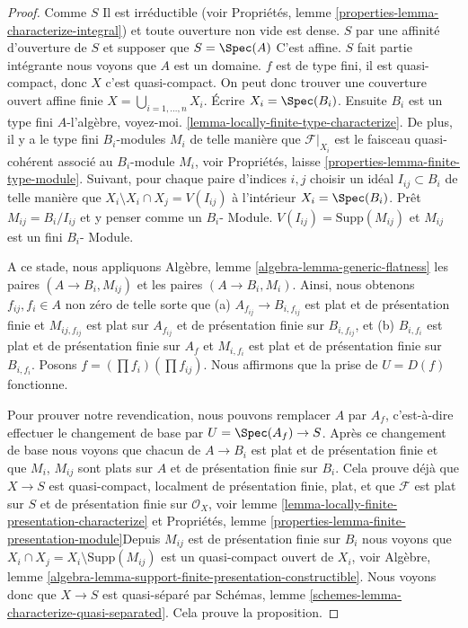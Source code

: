 \begin{proof}

Comme $S$ Il est irréductible (voir Propriétés, lemme \ref{properties-lemma-characterize-integral}) et toute ouverture non vide est dense.
$S$ par une affinité d'ouverture de $S$ et supposer que $S = \Spec(A)$ C'est affine. $S$ fait partie intégrante nous voyons que $A$ est un domaine. $f$ est de type fini, il est quasi-compact, donc $X$ c'est quasi-compact. On peut donc trouver une couverture ouvert affine finie
$X = \bigcup_{i = 1, \ldots, n} X_i$. Écrire $X_i = \Spec(B_i)$. Ensuite $B_i$ est un type fini $A$-l'algèbre, voyez-moi. \ref{lemma-locally-finite-type-characterize}. De plus, il y a le type fini
$B_i$-modules $M_i$ de telle manière que $\mathcal{F}|_{X_i}$ est le faisceau quasi-cohérent associé au $B_i$-module $M_i$, voir Propriétés, laisse \ref{properties-lemma-finite-type-module}. Suivant, pour chaque paire d'indices $i, j$ choisir un idéal $I_{ij} \subset B_i$
de telle manière que $X_i \setminus X_i \cap X_j = V(I_{ij})$ à l'intérieur
$X_i = \Spec(B_i)$. Prêt $M_{ij} = B_i/I_{ij}$ et y penser comme un $B_i$- Module. $V(I_{ij}) = \text{Supp}(M_{ij})$
et $M_{ij}$ est un fini $B_i$- Module.

\medskip\noindent
A ce stade, nous appliquons Algèbre, lemme \ref{algebra-lemma-generic-flatness} les paires $(A \to B_i, M_{ij})$ et les paires $(A \to B_i, M_i)$. Ainsi, nous obtenons $f_{ij}, f_i \in A$ non zéro de telle sorte que (a) $A_{f_{ij}} \to B_{i, f_{ij}}$ est plat et de présentation finie et $M_{ij, f_{ij}}$ est plat sur $A_{f_{ij}}$ et de présentation finie sur $B_{i, f_{ij}}$, et (b) $B_{i, f_i}$ est plat et de présentation finie sur $A_f$ et $M_{i, f_i}$ est plat et de présentation finie sur $B_{i, f_i}$. Posons $f = (\prod f_i) (\prod f_{ij})$. Nous affirmons que la prise de $U = D(f)$ fonctionne.

\medskip\noindent

Pour prouver notre revendication, nous pouvons remplacer $A$ par $A_f$, c'est-à-dire effectuer le changement de base par $U = \Spec(A_f) \to S$. Après ce changement de base nous voyons que chacun de $A \to B_i$ est plat et de présentation finie et que $M_i$, $M_{ij}$ sont plats sur $A$
et de présentation finie sur $B_i$. Cela prouve déjà que $X \to S$ est quasi-compact, localment de présentation finie, plat, et que $\mathcal{F}$
est plat sur $S$ et de présentation finie sur $\mathcal{O}_X$, voir lemme \ref{lemma-locally-finite-presentation-characterize}
et Propriétés, lemme \ref{properties-lemma-finite-presentation-module}Depuis $M_{ij}$ est de présentation finie sur $B_i$ nous voyons que
$X_i \cap X_j = X_i \setminus \text{Supp}(M_{ij})$ est un quasi-compact ouvert de $X_i$, voir Algèbre, lemme \ref{algebra-lemma-support-finite-presentation-constructible}. Nous voyons donc que $X \to S$ est quasi-séparé par Schémas, lemme \ref{schemes-lemma-characterize-quasi-separated}. Cela prouve la proposition.

\end{proof}

